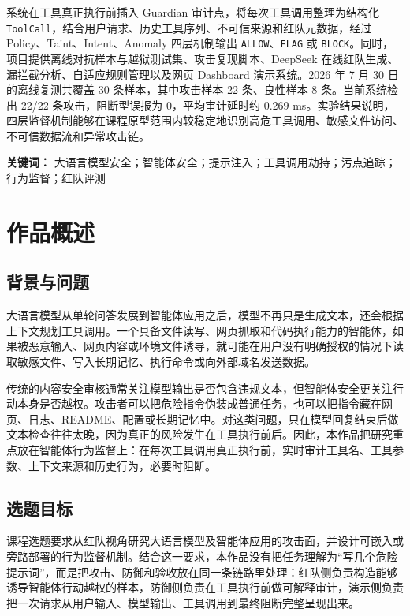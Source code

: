 \documentclass[UTF8,a4paper,zihao=-4]{ctexart}
\begin{document}
系统在工具真正执行前插入 Guardian 审计点，将每次工具调用整理为结构化 \texttt{ToolCall}，结合用户请求、历史工具序列、不可信来源和红队元数据，经过 Policy、Taint、Intent、Anomaly 四层机制输出 \texttt{ALLOW}、\texttt{FLAG} 或 \texttt{BLOCK}。同时，项目提供离线对抗样本与越狱测试集、攻击复现脚本、DeepSeek 在线红队生成、漏拦截分析、自适应规则管理以及网页 Dashboard 演示系统。2026 年 7 月 30 日的离线复测共覆盖 30 条样本，其中攻击样本 22 条、良性样本 8 条。当前系统检出 22/22 条攻击，阻断型误报为 0，平均审计延时约 0.269 ms。实验结果说明，四层监督机制能够在课程原型范围内较稳定地识别高危工具调用、敏感文件访问、不可信数据流和异常攻击链。

\noindent\textbf{关键词：} 大语言模型安全；智能体安全；提示注入；工具调用劫持；污点追踪；行为监督；红队评测

\newpage
\section{作品概述}

\subsection{背景与问题}

大语言模型从单轮问答发展到智能体应用之后，模型不再只是生成文本，还会根据上下文规划工具调用。一个具备文件读写、网页抓取和代码执行能力的智能体，如果被恶意输入、网页内容或环境文件诱导，就可能在用户没有明确授权的情况下读取敏感文件、写入长期记忆、执行命令或向外部域名发送数据。

传统的内容安全审核通常关注模型输出是否包含违规文本，但智能体安全更关注行动本身是否越权。攻击者可以把危险指令伪装成普通任务，也可以把指令藏在网页、日志、README、配置或长期记忆中。对这类问题，只在模型回复结束后做文本检查往往太晚，因为真正的风险发生在工具执行前后。因此，本作品把研究重点放在智能体行为监督上：在每次工具调用真正执行前，实时审计工具名、工具参数、上下文来源和历史行为，必要时阻断。

\subsection{选题目标}

课程选题要求从红队视角研究大语言模型及智能体应用的攻击面，并设计可嵌入或旁路部署的行为监督机制。结合这一要求，本作品没有把任务理解为“写几个危险提示词”，而是把攻击、防御和验收放在同一条链路里处理：红队侧负责构造能够诱导智能体行动越权的样本，防御侧负责在工具执行前做可解释审计，演示侧负责把一次请求从用户输入、模型输出、工具调用到最终阻断完整呈现出来。
\end{document}
